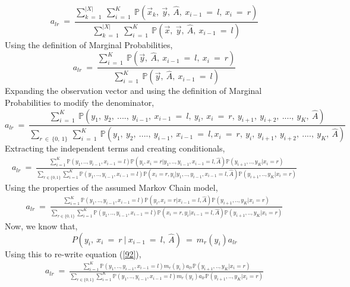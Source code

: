 \documentclass[12pt, draftcls, onecolumn]{IEEEtran}
\begin{document}
\begin{equation}\label{87}
    a_{lr}\ =\ \frac{\sum_{k\ =\ 1}^{|X|}\ \sum_{i\ =\ 1}^{K}\ \mathbb{P}(\vec{x}_k,\ \vec{y},\ \hat{A},\ x_{i-1}\ =\ l,\ x_i\ =\ r)}{\sum_{k\ =\ 1}^{|X|}\ \sum_{i\ =\ 1}^{K}\ \mathbb{P}(\vec{x},\ \vec{y},\ \hat{A},\ x_{i-1}\ =\ l)}
\end{equation}
Using the definition of Marginal Probabilities,
\begin{equation}\label{88}
    a_{lr}\ =\ \frac{\sum_{i\ =\ 1}^{K}\ \mathbb{P}(\vec{y},\ \hat{A},\ x_{i-1}\ =\ l,\ x_i\ =\ r)}{\sum_{i\ =\ 1}^{K}\ \mathbb{P}(\vec{y},\ \hat{A},\ x_{i-1}\ =\ l)}
\end{equation}
Expanding the observation vector and using the definition of Marginal Probabilities to modify the denominator,
\begin{equation}\label{89}
    a_{lr}\ =\ \frac{\sum_{i\ =\ 1}^{K}\ \mathbb{P}(y_1,\ y_2,\ ....,\ y_{i-1},\ x_{i-1}\ =\ l,\ y_i,\ x_i\ =\ r,\ y_{i+1},\ y_{i+2},\ ....,\ y_K,\ \hat{A})}{\sum_{r\ \in\ \{0,\ 1\}}\ \sum_{i\ =\ 1}^{K}\ \mathbb{P}(y_1,\ y_2,\ ....,\ y_{i-1},\ x_{i-1}\ =\ l,x_i\ =\ r,\ y_i,\ y_{i+1},\ y_{i+2},\ ....,\ y_K,\ \hat{A})}
\end{equation}
Extracting the independent terms and creating conditionals,
\begin{equation}\label{90}
    \begin{aligned}
        a_{lr}\ =\ \frac{\sum_{i=1}^{K}\mathbb{P}(y_1,..,y_{i-1},x_{i-1}=l)\mathbb{P}(y_i,x_i=r|y_1,..,y_{i-1},x_{i-1}=l,\hat{A})\mathbb{P}(y_{i+1},..,y_K|x_i=r)}{\sum_{r\in\{0,1\}}\sum_{i=1}^{K}\mathbb{P}(y_1,..,y_{i-1},x_{i-1}=l)\mathbb{P}(x_i=r,y_i|y_1,..,y_{i-1},x_{i-1}=l,\hat{A})\mathbb{P}(y_{i+1},..,y_K|x_i=r)}
    \end{aligned}
\end{equation}
Using the properties of the assumed Markov Chain model,
\begin{equation}\label{91}
    \begin{aligned}
        a_{lr}\ =\ \frac{\sum_{i=1}^{K}\mathbb{P}(y_1,..,y_{i-1},x_{i-1}=l)\mathbb{P}(y_i,x_i=r|x_{i-1}=l,\hat{A})\mathbb{P}(y_{i+1},..,y_K|x_i=r)}{\sum_{r\in\{0,1\}}\sum_{i=1}^{K}\mathbb{P}(y_1,..,y_{i-1},x_{i-1}=l)\mathbb{P}(x_i=r,y_i|x_{i-1}=l,\hat{A})\mathbb{P}(y_{i+1},..,y_K|x_i=r)}
    \end{aligned}
\end{equation}
Now, we know that,
\[P(y_i,\ x_i\ =\ r\ |\ x_{i-1}\ =\ l,\ \hat{A})\ =\ m_r(y_i)a_{lr}\]
Using this to re-write equation (\ref{92}),
\begin{equation}\label{92}
    \begin{aligned}
        a_{lr}\ =\ \frac{\sum_{i=1}^{K}\mathbb{P}(y_1,..,y_{i-1},x_{i-1}=l)m_r(y_i)a_{lr}\mathbb{P}(y_{i+1},..,y_K|x_i=r)}{\sum_{r\in\{0,1\}}\sum_{i=1}^{K}\mathbb{P}(y_1,..,y_{i-1},x_{i-1}=l)m_r(y_i)a_{lr}\mathbb{P}(y_{i+1},..,y_K|x_i=r)}
    \end{aligned}
\end{equation}
\end{document}
